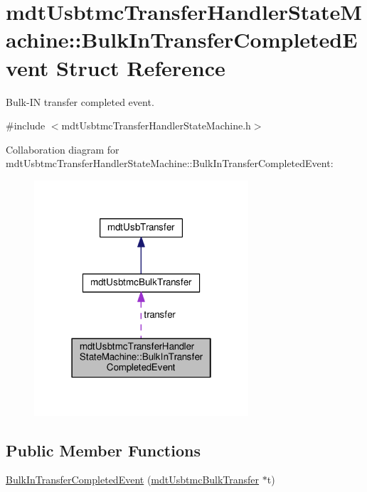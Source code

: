 \hypertarget{structmdt_usbtmc_transfer_handler_state_machine_1_1_bulk_in_transfer_completed_event}{\section{mdt\-Usbtmc\-Transfer\-Handler\-State\-Machine\-:\-:Bulk\-In\-Transfer\-Completed\-Event Struct Reference}
\label{structmdt_usbtmc_transfer_handler_state_machine_1_1_bulk_in_transfer_completed_event}
}


Bulk-\/\-I\-N transfer completed event.  




{\ttfamily \#include $<$mdt\-Usbtmc\-Transfer\-Handler\-State\-Machine.\-h$>$}



Collaboration diagram for mdt\-Usbtmc\-Transfer\-Handler\-State\-Machine\-:\-:Bulk\-In\-Transfer\-Completed\-Event\-:
\nopagebreak
\begin{figure}[H]
\begin{center}
\leavevmode
\includegraphics[width=226pt]{structmdt_usbtmc_transfer_handler_state_machine_1_1_bulk_in_transfer_completed_event__coll__graph}
\end{center}
\end{figure}
\subsection*{Public Member Functions}
\begin{DoxyCompactItemize}
\item 
\hyperlink{structmdt_usbtmc_transfer_handler_state_machine_1_1_bulk_in_transfer_completed_event_aaf84232c57add6fb63bc4946d4867387}{Bulk\-In\-Transfer\-Completed\-Event} (\hyperlink{classmdt_usbtmc_bulk_transfer}{mdt\-Usbtmc\-Bulk\-Transfer} $\ast$t)
\end{DoxyCompactItemize}
